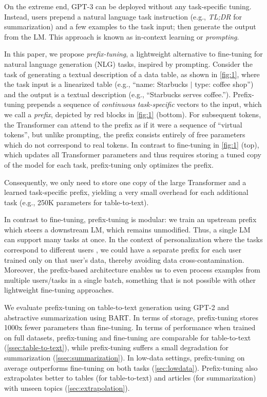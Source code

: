 On the extreme end, GPT-3 \cite{brown2020language} can be deployed without any task-specific tuning. Instead, users prepend a natural language task instruction (e.g., \textit{TL;DR} for summarization) and a few examples to the task input; then generate the output from the LM. This approach is known as in-context learning or \emph{prompting}.

In this paper, we propose \textit{prefix-tuning}, a lightweight alternative to fine-tuning for natural language generation (NLG) tasks, inspired by prompting. Consider the task of generating a textual description of a data table, as shown in \ref{fig:1}, where the task input is a linearized table (e.g., ``name: Starbucks $|$ type: coffee shop'') and the output is a textual description (e.g., ``Starbucks serves coffee.''). Prefix-tuning prepends a sequence of  \emph{continuous} \emph{task-specific} vectors to the input, which we call a  \emph{prefix}, depicted by red blocks in \ref{fig:1} (bottom).  For subsequent tokens, the Transformer can attend to the prefix as if it were a sequence of ``virtual tokens'', but unlike prompting, the prefix consists entirely  of free parameters which do not correspond to real tokens. In contrast to fine-tuning in \ref{fig:1} (top), which updates all Transformer parameters and thus requires storing a tuned copy of the model for each task, prefix-tuning only optimizes the prefix. 

Consequently, we only need to store one copy of the large Transformer and a learned task-specific prefix, yielding a very small overhead for each additional task (e.g., 250K parameters for table-to-text).

In contrast to fine-tuning, prefix-tuning is modular: we train an upstream prefix which steers a downstream LM, which remains unmodified. Thus, a single LM can support many tasks at once. In the context of personalization where the tasks correspond to different users \cite{Shokri-Shmatikov-2015, McMahan-et-al-2016}, we could have a separate prefix for each user trained only on that user's data, thereby avoiding data cross-contamination. Moreover, the prefix-based architecture enables us to even process examples from multiple users/tasks in a single batch, something that is not possible with other lightweight fine-tuning approaches.

We evaluate prefix-tuning on table-to-text generation using GPT-2 and abstractive summarization using BART. In terms of storage, prefix-tuning  stores 1000x fewer parameters than fine-tuning. In terms of performance when trained on full datasets, prefix-tuning and fine-tuning are comparable for table-to-text (\ref{ssec:table-to-text}), while prefix-tuning suffers a small degradation for summarization (\ref{ssec:summarization}). In low-data settings, prefix-tuning on average outperforms fine-tuning on both tasks (\ref{sec:lowdata}). 
Prefix-tuning also extrapolates better to tables (for table-to-text) and articles (for summarization) with unseen topics (\ref{sec:extrapolation}). 

